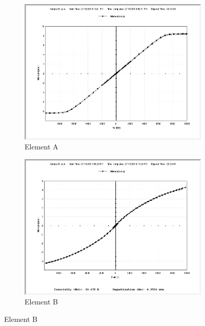\documentclass{../paper}
\begin{document}
\begin{figure}
  \centering
  \begin{subfigure}{\columnwidth}
    \centering
    \includegraphics[width=\textwidth]{data/aij-a-2-11-0.png}
    \caption{Element A}
    \label{fig:elementA}
  \end{subfigure}
  \begin{subfigure}{\columnwidth}
    \centering
    \includegraphics[width=\textwidth]{data/aij-b-2-13-0.png}
    \caption{Element B}
    \label{fig:elementB}
  \end{subfigure}


\end{figure}
\end{document}
